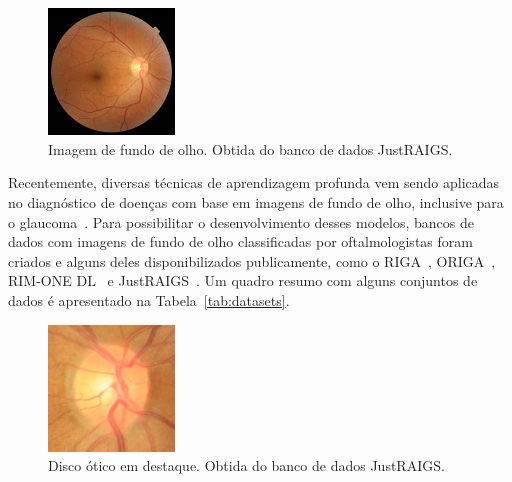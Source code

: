 \documentclass[12pt]{article}
\begin{document}
\begin{figure}[htb]
 \centering
 \includegraphics[width=0.3\textwidth]{images/TRAIN000004_cut.JPG}
 \caption{Imagem de fundo de olho. Obtida do banco de dados JustRAIGS.}
 \label{fig:fundus}
\end{figure}

Recentemente, diversas técnicas de aprendizagem profunda vem sendo aplicadas no diagnóstico de doenças com base em imagens de fundo de olho, inclusive para o glaucoma~\cite{li_review_2021}. Para possibilitar o desenvolvimento desses modelos, bancos de dados com imagens de fundo de olho classificadas por oftalmologistas foram criados e alguns deles disponibilizados publicamente, como o RIGA~\cite{riga}, ORIGA~\cite{origa}, RIM-ONE DL~\cite{RIMONEDL} e JustRAIGS~\cite{justraigs}. Um quadro resumo com alguns conjuntos de dados é apresentado na Tabela~\ref{tab:datasets}. 

\begin{figure}[htb]
 \centering
 \includegraphics[width=0.3\textwidth]{images/disk.jpg}
 \caption{Disco ótico em destaque. Obtida do banco de dados JustRAIGS.}
 \label{fig:disk}
\end{figure}
\end{document}
